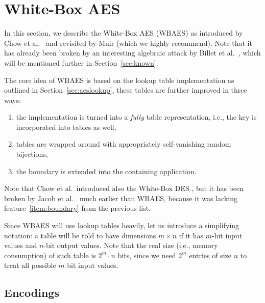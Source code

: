 \section{White-Box AES}
\label{sec:wbaes}

In this section, we describe the White-Box AES (WBAES) as introduced by Chow et al.\ \cite{chow2002aes} and revisited by Muir \cite{muir2013tutorial} (which we highly recommend). Note that it has already been broken by an interesting algebraic attack by Billet et al.\ \cite{billet2004cryptanalysis}, which will be mentioned further in Section~\ref{sec:known}.

The core idea of WBAES is based on the lookup table implementation as outlined in Section~\ref{sec:aeslookup}, these tables are further improved in three ways:
\begin{enumerate}
	\item the implementation is turned into a {\em fully} table representation, i.e., the key is incorporated into tables as well,
	\item tables are wrapped around with appropriately self-vanishing random bijections, \label{item:wrap}
	\item the boundary is extended into the containing application. \label{item:boundary}
\end{enumerate}
Note that Chow et al.\ introduced also the White-Box DES \cite{chow2002des}, but it has been broken by Jacob et al.\ \cite{jacob2002attacking} much earlier than WBAES, because it was lacking feature~\ref{item:boundary} from the previous list.

\begin{notation}
\label{notation:table}
	Since WBAES will use lookup tables heavily, let us introduce a simplifying notation: a table will be told to have dimensions $m\times n$ if it has $m$-bit input values and $n$-bit output values. Note that the real size (i.e., memory consumption) of such table is $2^m\cdot n$ bits, since we need $2^m$ entries of size $n$ to treat all possible $m$-bit input values.
\end{notation}



\subsection{Encodings}
\label{sec:encod}

